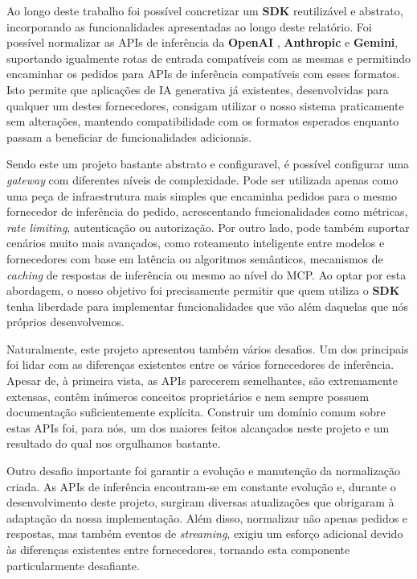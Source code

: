     Ao longo deste trabalho foi possível concretizar um \textbf{SDK} reutilizável e abstrato, incorporando as funcionalidades apresentadas ao longo deste relatório. Foi possível normalizar as APIs de inferência da \textbf{OpenAI} \cite{openai_api}, \textbf{Anthropic} \cite{anthropic_api} e \textbf{Gemini}\cite{google_gemini_api}, suportando igualmente rotas de entrada compatíveis com as mesmas e permitindo encaminhar os pedidos para APIs de inferência compatíveis com esses formatos. Isto permite que aplicações de IA generativa já existentes, desenvolvidas para qualquer um destes fornecedores, consigam utilizar o nosso sistema praticamente sem alterações, mantendo compatibilidade com os formatos esperados enquanto passam a beneficiar de funcionalidades adicionais.

    Sendo este um projeto bastante abstrato e configuravel, é possível configurar uma \textit{gateway} com diferentes níveis de complexidade. Pode ser utilizada apenas como uma peça de infraestrutura mais simples que encaminha pedidos para o mesmo fornecedor de inferência do pedido, acrescentando funcionalidades como métricas, \textit{rate limiting}, autenticação ou autorização. Por outro lado, pode também suportar cenários muito mais avançados, como roteamento inteligente entre modelos e fornecedores com base em latência ou algoritmos semânticos, mecanismos de \textit{caching} de respostas de inferência ou mesmo ao nível do MCP. Ao optar por esta abordagem, o nosso objetivo foi precisamente permitir que quem utiliza o \textbf{SDK} tenha liberdade para implementar funcionalidades que vão além daquelas que nós próprios desenvolvemos.

    Naturalmente, este projeto apresentou também vários desafios. Um dos principais foi lidar com as diferenças existentes entre os vários fornecedores de inferência. Apesar de, à primeira vista, as APIs parecerem semelhantes, são extremamente extensas, contêm inúmeros conceitos proprietários e nem sempre possuem documentação suficientemente explícita. Construir um domínio comum sobre estas APIs foi, para nós, um dos maiores feitos alcançados neste projeto e um resultado do qual nos orgulhamos bastante.

    Outro desafio importante foi garantir a evolução e manutenção da normalização criada. As APIs de inferência encontram-se em constante evolução e, durante o desenvolvimento deste projeto, surgiram diversas atualizações que obrigaram à adaptação da nossa implementação. Além disso, normalizar não apenas pedidos e respostas, mas também eventos de \textit{streaming}, exigiu um esforço adicional devido às diferenças existentes entre fornecedores, tornando esta componente particularmente desafiante.

